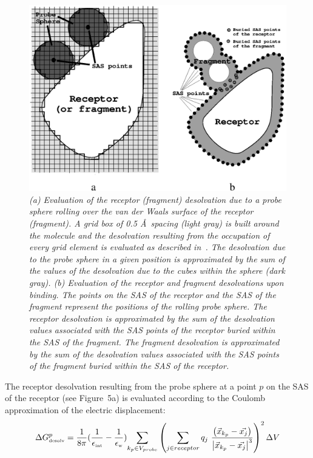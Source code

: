 \documentclass[a4paper,12pt,titlepage]{article}
\begin{document}
\begin{figure}
\begin{center}
\includegraphics[scale=0.9]{figures/fig2.ps}
\end{center}
\caption{\it
(a) Evaluation of the receptor (fragment) desolvation due to a probe sphere 
rolling over the van der Waals surface of the receptor (fragment). A grid box of
0.5 \AA~spacing (light 
gray) is built around the molecule and the desolvation resulting from the 
occupation of every grid element is evaluated as described 
in~\cite{Majeux:Exhaustive}. The desolvation due to the probe sphere in a 
given position is approximated by the sum of the values of the desolvation due to
the cubes within the sphere (dark gray).
(b) Evaluation of the receptor and fragment desolvations upon binding. The 
points on the SAS of the receptor and the SAS of the fragment represent the 
positions of the rolling probe sphere. The receptor desolvation is approximated 
by the sum of the desolvation values associated with the SAS points of the 
receptor buried within the SAS of the fragment. The fragment desolvation is 
approximated by the sum of the desolvation values associated with the SAS 
points of the fragment buried within the SAS of the receptor.
}
\end{figure}
The receptor desolvation resulting from the probe sphere
at a point $p$ on the SAS of the receptor
(see Figure~5a) is evaluated according to the Coulomb approximation of the 
electric displacement: 
%
\begin{equation}
%
\Delta G^{p}_{\mbox{\tiny desolv}} = {1 \over {8\pi} } 
(\frac{1}{\epsilon_{\mbox{\tiny int}}} - \frac{1}{\epsilon_{\mbox {\tiny w}}}) 
{\sum_{k_p \in V_{probe}} \left( \sum_{j \in {\small receptor}} q_j 
\ \frac{\left(\vec{x}_{k_p}-\vec{x_j}\right)} 
{\left|\vec{x}_{k_p}-\vec{x_j}\right| ^3} \right)^2  \Delta V}  
\label{eq:redesofinal} 
%
\end{equation}
\end{document}
